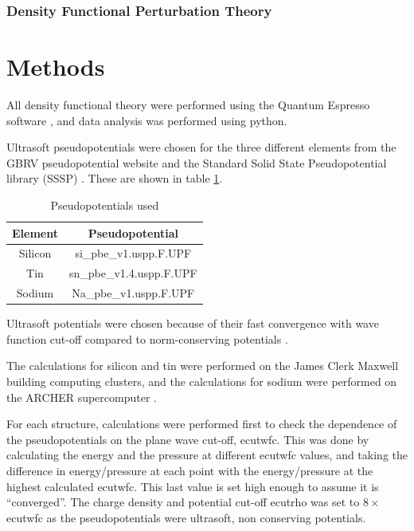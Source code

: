 \documentclass[12pt]{article}
\begin{document}
\subsubsection{Density Functional Perturbation Theory}

\section{Methods}
All density functional theory were performed using the Quantum Espresso software \cite{0953-8984-21-39-395502}, and data analysis was performed using python.

Ultrasoft pseudopotentials were chosen for the three different elements from the GBRV pseudopotential website \cite{rutgers} and the Standard Solid State Pseudopotential library (SSSP) \cite{SSSPwebsite}. 
These are shown in table \ref{tab:pseudopotentials}.
\begin{table}
\centering
	\begin{tabular}{|c|c|}
\hline
Element & Pseudopotential \\
\hline
Silicon & si\_pbe\_v1.uspp.F.UPF \cite{rutgers} \\
Tin & sn\_pbe\_v1.4.uspp.F.UPF \cite{rutgers} \\
Sodium & Na\_pbe\_v1.uspp.F.UPF \cite{SSSPwebsite} \\
\hline
\end{tabular}
\caption{Pseudopotentials used}
\label{tab:pseudopotentials}
\end{table}

Ultrasoft potentials were chosen because of their fast convergence with wave function cut-off compared to norm-conserving potentials \cite{vanderbilt1990soft}. 

The calculations for silicon and tin were performed on the James Clerk Maxwell building computing clusters, and the calculations for sodium were performed on the ARCHER supercomputer \cite{archer}.

For each structure, calculations were performed first to check the dependence of the pseudopotentials on the plane wave cut-off, ecutwfc. This was done by calculating the energy and the pressure at different ecutwfc values, and taking the difference in energy/pressure at each point with the energy/pressure at the highest calculated ecutwfc. This last value is set high enough to assume it is ``converged''. 
The charge density and potential cut-off ecutrho was set to $8\times$ ecutwfc as the pseudopotentials were ultrasoft, non conserving potentials.
\end{document}

